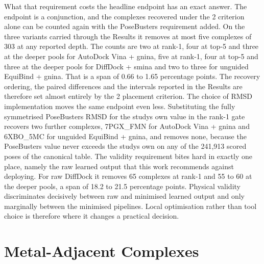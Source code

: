 What that requirement costs the headline endpoint has an exact answer. The endpoint is a conjunction, and the complexes recovered under the 2\angstrom{} criterion alone can be counted again with the PoseBusters requirement added. On the three variants carried through the Results it removes at most five complexes of 303 at any reported depth. The counts are two at rank-1, four at top-5 and three at the deeper pools for AutoDock Vina + gnina, five at rank-1, four at top-5 and three at the deeper pools for DiffDock + smina and two to three for unguided EquiBind + gnina. That is a span of 0.66 to 1.65 percentage points. The recovery ordering, the paired differences and the intervals reported in the Results are therefore set almost entirely by the 2\angstrom{} placement criterion. The choice of RMSD implementation moves the same endpoint even less. Substituting the fully symmetrised PoseBusters RMSD for the study\textquotesingle s own value in the rank-1 gate recovers two further complexes, 7PGX\_FMN for AutoDock Vina + gnina and 6XBO\_5MC for unguided EquiBind + gnina, and removes none, because the PoseBusters value never exceeds the study\textquotesingle s own on any of the 241,913 scored poses of the canonical table. The validity requirement bites hard in exactly one place, namely the raw learned output that this work recommends against deploying. For raw DiffDock it removes 65 complexes at rank-1 and 55 to 60 at the deeper pools, a span of 18.2 to 21.5 percentage points. Physical validity discriminates decisively between raw and minimised learned output and only marginally between the minimised pipelines. Local optimisation rather than tool choice is therefore where it changes a practical decision.

\hypertarget{metal-adjacent-stratum}{%
\section{Metal-Adjacent Complexes}\label{metal-adjacent-stratum}}

